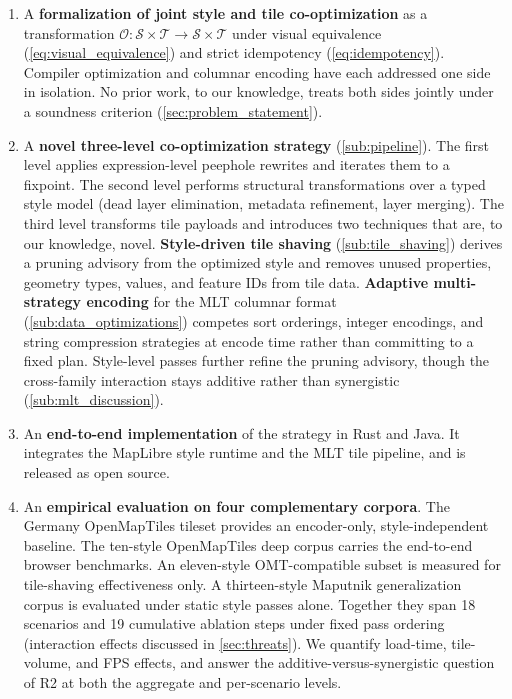 \begin{enumerate}[label=\textbf{C\arabic*}]
    \item A \textbf{formalization of joint style and tile co-optimization} as a transformation $\mathcal{O}: \mathcal{S} \times \mathcal{T} \to \mathcal{S} \times \mathcal{T}$ under visual equivalence (\cref{eq:visual_equivalence}) and strict idempotency (\cref{eq:idempotency}).
    Compiler optimization and columnar encoding have each addressed one side in isolation.
    No prior work, to our knowledge, treats both sides jointly under a soundness criterion (\cref{sec:problem_statement}).

    \item A \textbf{novel three-level co-optimization strategy} (\cref{sub:pipeline}).
    The first level applies expression-level peephole rewrites and iterates them to a fixpoint.
    The second level performs structural transformations over a typed style model (dead layer elimination, metadata refinement, layer merging).
    The third level transforms tile payloads and introduces two techniques that are, to our knowledge, novel.
    \textbf{Style-driven tile shaving} (\cref{sub:tile_shaving}) derives a pruning advisory from the optimized style and removes unused properties, geometry types, values, and feature IDs from tile data.
    \textbf{Adaptive multi-strategy encoding} for the \ac{MLT} columnar format (\cref{sub:data_optimizations}) competes sort orderings, integer encodings, and string compression strategies at encode time rather than committing to a fixed plan.
    Style-level passes further refine the pruning advisory, though the cross-family interaction stays additive rather than synergistic (\cref{sub:mlt_discussion}).

    \item An \textbf{end-to-end implementation} of the strategy in Rust and Java.
    It integrates the MapLibre style runtime and the \ac{MLT} tile pipeline, and is released as open source.

    \item An \textbf{empirical evaluation on four complementary corpora}.
    The Germany OpenMapTiles tileset provides an encoder-only, style-independent baseline.
    The ten-style OpenMapTiles deep corpus carries the end-to-end browser benchmarks.
    An eleven-style \ac{OMT}-compatible subset is measured for tile-shaving effectiveness only.
    A thirteen-style Maputnik generalization corpus is evaluated under static style passes alone.
    Together they span 18 scenarios and 19 cumulative ablation steps under fixed pass ordering (interaction effects discussed in \cref{sec:threats}).
    We quantify load-time, tile-volume, and \ac{FPS} effects, and answer the additive-versus-synergistic question of R2 at both the aggregate and per-scenario levels.
\end{enumerate}

